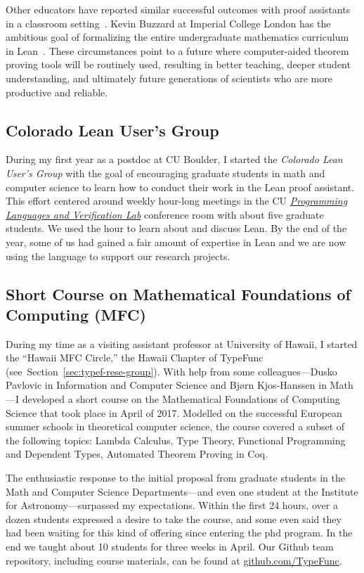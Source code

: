 Other educators have reported similar successful outcomes with proof assistants in a classroom setting~\cite{nipkow:2012,pierce:2009}. Kevin Buzzard at Imperial College London has the ambitious goal of formalizing the entire undergraduate mathematics curriculum in Lean~\cite{buzzard}. These circumstances point to a future where computer-aided theorem proving tools will be routinely used, resulting in better teaching, deeper student understanding, and ultimately future generations of scientists who are more productive and reliable.

\newpage

\subsection{Colorado Lean User's Group} During my first year as a postdoc at CU Boulder, I started the \emph{Colorado Lean User's Group} with the goal of encouraging graduate students in math and computer science to learn how to conduct their work in the Lean proof assistant. This effort centered around weekly hour-long meetings in the CU \emph{\href{https://plv.colorado.edu/}{Programming Languages and Verification Lab}} conference room with about five graduate students. We used the hour to learn about and discuss Lean.  By the end of the year, some of us had gained a fair amount of expertise in Lean and we are now using the language to support our research projects.

\bigskip

\subsection{Short Course on Mathematical Foundations of Computing (MFC)} During my time as a visiting assistant professor at University of Hawaii, I started the ``Hawaii MFC Circle,'' the Hawaii Chapter of TypeFunc (see~Section~\ref{sec:typef-rese-group}). With  help from some colleagues---Dusko Pavlovic in Information and Computer Science and Bj{\o}rn Kjos-Hanssen in Math---I developed a short course on the Mathematical Foundations of Computing Science that took place in April of 2017. Modelled on the successful European summer schools in theoretical computer science, the course covered a subset of the following topics: Lambda Calculus, Type Theory, Functional Programming and Dependent Types, Automated Theorem Proving in Coq.

The enthusiastic response to the initial proposal from graduate students in the Math and Computer Science Departments---and even one student at the Institute for Astronomy---surpassed my expectations. Within the first 24 hours, over a dozen students expressed a desire to take the course, and some even said they had been waiting for this kind of offering since entering the phd program. In the end we taught about 10 students for three weeks in April.  Our Github team repository, including course materials, can be found at \href{https://github.com/TypeFunc}{github.com/TypeFunc}.

